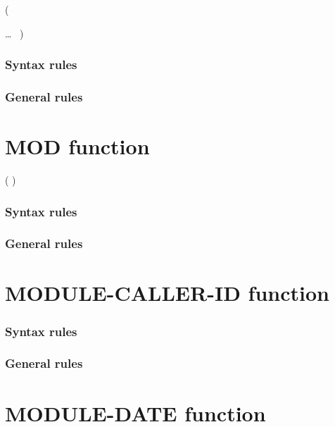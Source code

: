 \begin{syntax}
    (
  \begin{1=}
    \argument
  \end{1=}\ldots
  \ {})
\end{syntax}

\subsubsection{Syntax rules}

\subsubsection{General rules}

\section{MOD function}

\begin{syntax}
    ( \argument \argument )
\end{syntax}

\subsubsection{Syntax rules}

\subsubsection{General rules}

\section{MODULE-CALLER-ID function}

\begin{syntax}[\gnucobolcolour]
   
\end{syntax}

\subsubsection{Syntax rules}

\subsubsection{General rules}

\section{MODULE-DATE function}

